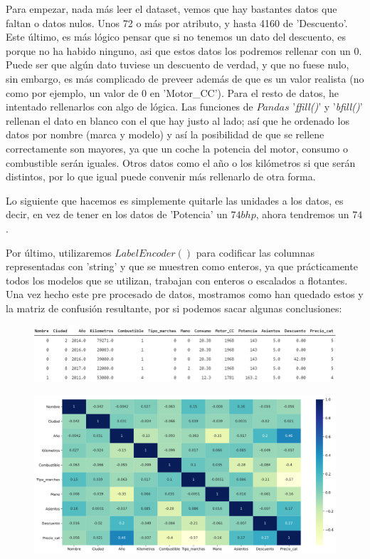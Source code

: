 \documentclass[11pt,a4paper]{article}
\begin{document}
\label{pp1}
Para empezar, nada más leer el dataset, vemos que hay bastantes datos que faltan o datos nulos. Unos 72 o más por atributo, y
hasta 4160 de 'Descuento'. Este último, es más lógico pensar que si no tenemos un dato del descuento, es porque no ha habido
ninguno, asi que estos datos los podremos rellenar con un 0. Puede ser que algún dato tuviese un descuento de verdad, y que no
fuese nulo, sin embargo, es más complicado de preveer además de que es un valor realista (no como por ejemplo, un valor de 0 en
'Motor\_CC'). Para el resto de datos, he intentado rellenarlos con algo de lógica. Las funciones de $Pandas$ '\textit{ffill()}' y
'\textit{bfill()}' rellenan el dato en blanco con el que hay justo al lado; así que he ordenado los datos por nombre (marca y
modelo) y así la posibilidad de que se rellene correctamente son mayores, ya que un coche la potencia del motor, consumo o
combustible serán iguales. Otros datos como el año o los kilómetros si que serán distintos, por lo que igual puede convenir más
rellenarlo de otra forma.

Lo siguiente que hacemos es simplemente quitarle las unidades a los datos, es decir, en vez de tener en los datos de 'Potencia' un
$74 bhp$, ahora tendremos un $74$.

Por último, utilizaremos $LabelEncoder()$ para codificar las columnas representadas con 'string' y que se muestren como enteros,
ya que prácticamente todos los modelos que se utilizan, trabajan con enteros o escalados a flotantes. Una vez hecho este pre
procesado de datos, mostramos como han quedado estos y la matriz de confusión resultante, por si podemos sacar algunas conclusiones:

\begin{figure}[H]
    \centering
    \includegraphics[scale=0.62]{img/data1.png}
\end{figure}

\begin{figure}[H]
    \centering
    \includegraphics[scale=0.32]{img/corr.png}
\end{figure}
\end{document}
